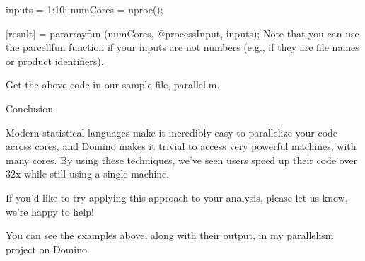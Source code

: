 inputs = 1:10;  
numCores = nproc();

[result] = pararrayfun (numCores, @processInput, inputs);
Note that you can use the parcellfun function if your inputs are not numbers (e.g., if they are file names or product identifiers).

Get the above code in our sample file, parallel.m.

Conclusion

Modern statistical languages make it incredibly easy to parallelize your code across cores, and Domino makes it trivial to access very powerful machines, with many cores. By using these techniques, we've seen users speed up their code over 32x while still using a single machine. 

If you'd like to try applying this approach to your analysis, please let us know, we're happy to help!

You can see the examples above, along with their output, in my parallelism project on Domino.

